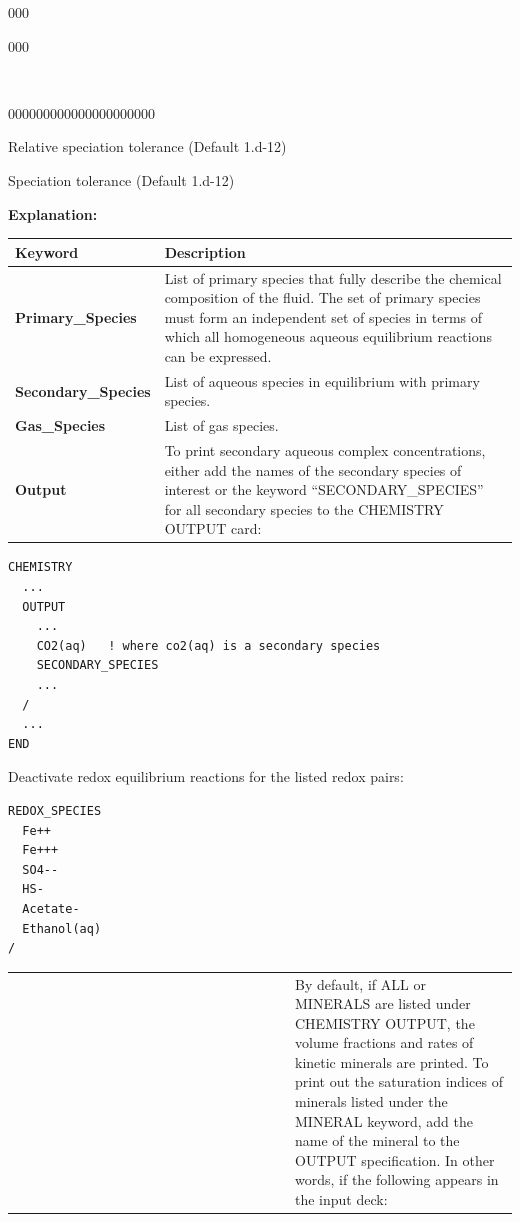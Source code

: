 \documentclass[12pt]{article}
\newcommand\keyend{{(., \, /, \, END)}}
\begin{document}
\begin{deflist}{000}
\begin{deflist}{000}
\item [\keyend]

~ 

\end{deflist}
\begin{deflist}{000000000000000000000}
\item[MAX\_RELATIVE\_CHANGE\_TOLERANCE] Relative speciation tolerance (Default 1.d-12)
\item[MAX\_RESIDUAL\_TOLERANCE] Speciation tolerance (Default 1.d-12)
\end{deflist}

\item [\keyend]
\end{deflist}

\noindent
{\bf Explanation:}

\begin{center}
\begin{tabularx}{\linewidth}{lX}
\toprule
\bf Keyword & \bf Description\\
\midrule
\bf Primary\_Species & List of primary species that fully describe the chemical composition of the fluid. The set of primary species must form an independent set of species in terms of which all homogeneous aqueous equilibrium reactions can be expressed.\\
\midrule
\bf Secondary\_Species & List of aqueous species in equilibrium with primary species.\\
\midrule
\bf Gas\_Species & List of gas species.\\
\midrule
\bf Output &
To print secondary aqueous complex concentrations, either add the names of the secondary species of interest or the keyword ``SECONDARY\_SPECIES'' for all secondary species to the CHEMISTRY OUTPUT card:
\end{tabularx}
\end{center}

\begin{verbatim}
CHEMISTRY
  ...
  OUTPUT
    ...
    CO2(aq)   ! where co2(aq) is a secondary species
    SECONDARY_SPECIES
    ...
  /
  ...
END
\end{verbatim}

Deactivate redox equilibrium reactions for the listed redox pairs:
\begin{verbatim}
REDOX_SPECIES
  Fe++
  Fe+++
  SO4--
  HS-
  Acetate-
  Ethanol(aq)
/
\end{verbatim}

\begin{center}
\begin{tabularx}{\linewidth}{lX}
~~~~~~~~~~~~~~~~~~~~~~~~~~~~~~~~~~~~~~ & By default, if ALL or MINERALS are listed under CHEMISTRY OUTPUT, the volume fractions and rates of kinetic minerals are printed.  To print out the saturation indices of minerals listed under the MINERAL keyword, add the name of the mineral to the OUTPUT specification.  In other words, if the following appears in the input deck:
\end{tabularx}
\end{center}
\end{document}
